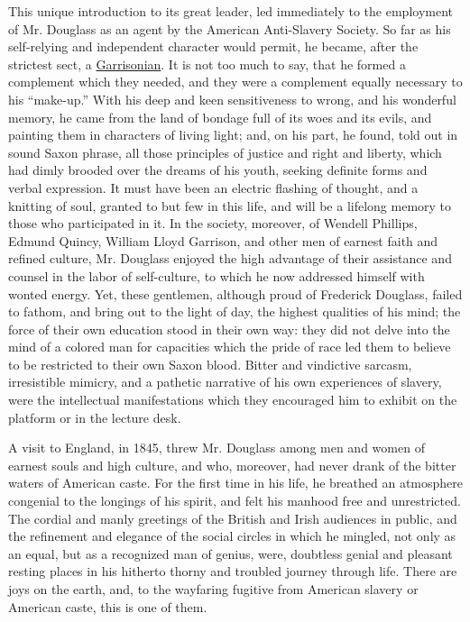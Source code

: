 This unique introduction to its great leader, led immediately to the
employment of Mr. Douglass as an agent by the American Anti-Slavery
Society. So far as his self-relying and independent character would
permit, he became, after the strictest sect, a
\href{https://en.wikipedia.org/wiki/William_Lloyd_Garrison}{Garrisonian}.
It is not too much to say, that he formed a complement which they
needed, and they were a complement equally necessary to his ``make-up.''
With his deep and keen sensitiveness to wrong, and his wonderful memory,
he came from the land of bondage full of its woes and its evils, and
painting them in characters of living light; and, on his part, he found,
told out in sound Saxon phrase, all those principles of justice and
right and liberty, which had dimly brooded over the dreams of his youth,
seeking definite forms and verbal expression. It must have been an
electric flashing of thought, and a knitting of soul, granted to but few
in this life, and will be a lifelong memory to those who participated in
it. In the society, moreover, of Wendell Phillips, Edmund Quincy,
William Lloyd Garrison, and other men of earnest faith and refined
culture, Mr. Douglass enjoyed the high advantage of their assistance and
counsel in the labor of self-culture, to which he now addressed himself
with wonted energy. Yet, these gentlemen, although proud of Frederick
Douglass, failed to fathom, and bring out to the light of day, the
highest qualities of his mind; the force of their own education stood in
their own way: they did not delve into the mind of a colored man for
capacities which the pride of race led them to believe to be restricted
to their own Saxon blood. Bitter and vindictive sarcasm, irresistible
mimicry, and a pathetic narrative of his own experiences of slavery,
were the intellectual manifestations which they encouraged him to
exhibit on the platform or in the lecture desk.

A visit to England, in 1845, threw Mr. Douglass among men and women of
earnest souls and high culture, and who, moreover, had never drank of
the bitter waters of American caste. For the first time in his life, he
breathed an atmosphere congenial to the longings of his spirit, and felt
his manhood free and unrestricted. The cordial and manly greetings of
the British and Irish audiences in {}public, and the refinement and
elegance of the social circles in which he mingled, not only as an
equal, but as a recognized man of genius, were, doubtless genial and
pleasant resting places in his hitherto thorny and troubled journey
through life. There are joys on the earth, and, to the wayfaring
fugitive from American slavery or American caste, this is one of them.

